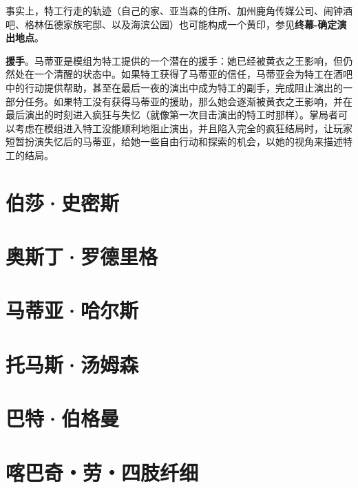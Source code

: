 事实上，特工行走的轨迹（自己的家、亚当森的住所、加州鹿角传媒公司、闹钟酒吧、格林伍德家族宅邸、以及海滨公园）也可能构成一个黄印，参见\textbf{终幕-确定演出地点}。

\textbf{援手}。马蒂亚是模组为特工提供的一个潜在的援手：她已经被黄衣之王影响，但仍然处在一个清醒的状态中。如果特工获得了马蒂亚的信任，马蒂亚会为特工在酒吧中的行动提供帮助，甚至在最后一夜的演出中成为特工的副手，完成阻止演出的一部分任务。如果特工没有获得马蒂亚的援助，那么她会逐渐被黄衣之王影响，并在最后演出的时刻进入疯狂与失忆（就像第一次目击演出的特工时那样）。掌局者可以考虑在模组进入特工没能顺利地阻止演出，并且陷入完全的疯狂结局时，让玩家短暂扮演失忆后的马蒂亚，给她一些自由行动和探索的机会，以她的视角来描述特工的结局。

\section{伯莎·史密斯}

\section{奥斯丁·罗德里格}

\section{马蒂亚·哈尔斯}

\section{托马斯·汤姆森}

\section{巴特·伯格曼}

\section{喀巴奇・劳・四肢纤细}